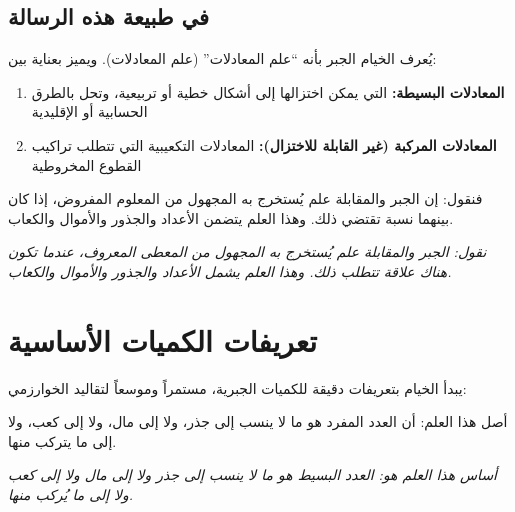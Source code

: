 \documentclass[11pt,a4paper]{book}
\newcommand{\ar}[1]{\leavevmode\arabicfont\beginR #1\endR}
\renewenvironment{leftbar}{\def\FrameCommand{\color{rulecolor}\vrule width 1.5pt\hspace{10pt}}\MakeFramed{\advance\hsize-\width\FrameRestore}}{\endMakeFramed}
\newenvironment{propbox}[1][]
  {\def\propboxtitle{#1}%
   \begin{snugshade}%
   \ifx\propboxtitle\empty\else
     \noindent{\bfseries\arabicfontbold\beginR #1\endR}\par\vspace{2pt}
   \fi}
  {\end{snugshade}}
\newenvironment{defbox}
  {\begin{leftbar}}
  {\end{leftbar}}
\begin{document}
\subsection{\ar{في طبيعة هذه الرسالة}}

\ar{يُعرف الخيام الجبر بأنه ``علم المعادلات'' (علم المعادلات). ويميز بعناية بين:}

\begin{enumerate}[noitemsep]
\item \textbf{\ar{المعادلات البسيطة:}} \ar{التي يمكن اختزالها إلى أشكال خطية أو تربيعية، وتحل بالطرق الحسابية أو الإقليدية}
\item \textbf{\ar{المعادلات المركبة (غير القابلة للاختزال):}} \ar{المعادلات التكعيبية التي تتطلب تراكيب القطوع المخروطية}
\end{enumerate}

\begin{propbox}[]
\ar{فنقول: إن الجبر والمقابلة علم يُستخرج به المجهول من المعلوم المفروض، إذا كان بينهما نسبة تقتضي ذلك. وهذا العلم يتضمن الأعداد والجذور والأموال والكعاب.}

\vspace{0.3cm}

\textit{نقول: الجبر والمقابلة علم يُستخرج به المجهول من المعطى المعروف، عندما تكون هناك علاقة تتطلب ذلك. وهذا العلم يشمل الأعداد والجذور والأموال والكعاب.}
\end{propbox}

\clearpage

\section{\ar{تعريفات الكميات الأساسية}}

\ar{يبدأ الخيام بتعريفات دقيقة للكميات الجبرية، مستمراً وموسعاً لتقاليد الخوارزمي:}

\begin{defbox}
\ar{أصل هذا العلم: أن العدد المفرد هو ما لا ينسب إلى جذر، ولا إلى مال، ولا إلى كعب، ولا إلى ما يتركب منها.}

\vspace{0.3cm}

\textit{أساس هذا العلم هو: العدد البسيط هو ما لا ينسب إلى جذر ولا إلى مال ولا إلى كعب ولا إلى ما يُركب منها.}
\end{defbox}
\end{document}
